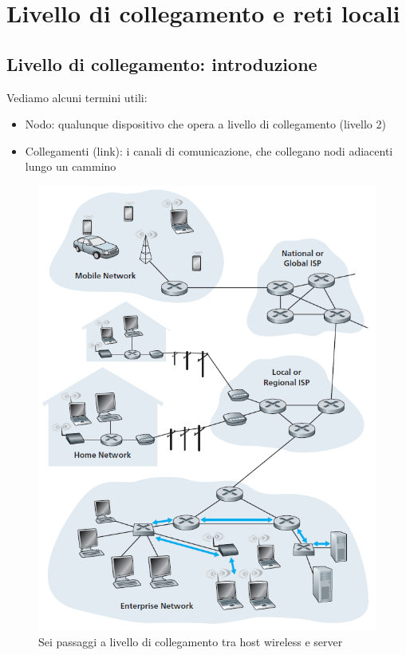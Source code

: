 \documentclass[11pt,a4paper]{book}
\begin{document}
\chapter{Livello di collegamento e reti locali}
\section{Livello di collegamento: introduzione}
Vediamo alcuni termini utili:
\begin{itemize}
	\item Nodo: qualunque dispositivo che opera a livello di collegamento (livello 2)
	\item Collegamenti (link): i canali di comunicazione, che collegano nodi adiacenti lungo un cammino
\end{itemize}
\begin{figure}
	\begin{center}
		\includegraphics[scale=1]{img/066.png}
		\caption{Sei passaggi a livello di collegamento tra host wireless e server}
		\label{fig: 066}
	\end{center}
\end{figure}
\end{document}
